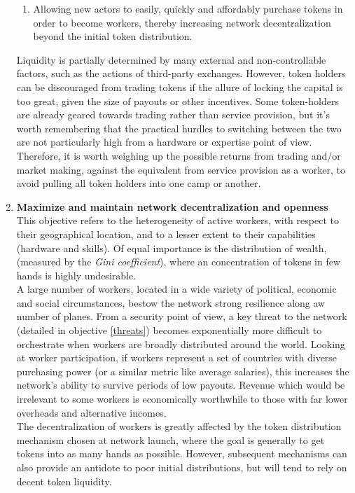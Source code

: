\documentclass[11pt]{amsart}
\begin{document}
\begin{enumerate}
\begin{enumerate}
   \item Allowing new actors to easily, quickly and affordably purchase tokens in order to become workers, thereby increasing network decentralization beyond the initial token distribution. 
   \end{enumerate}
   Liquidity is partially determined by many external and non-controllable factors, such as the actions of third-party exchanges. However, token holders can be discouraged from trading tokens if the allure of locking the capital is too great, given the size of payouts or other incentives. Some token-holders are already geared towards trading rather than service provision, but it's worth remembering that the practical hurdles to switching between the two are not particularly high from a hardware or expertise point of view. Therefore, it is worth weighing up the possible returns from trading and/or market making, against the equivalent from service provision as a worker, to avoid pulling all token holders into one camp or another. 
   \\
   \item \textbf{Maximize and maintain network decentralization and openness}\label{decent}
   \\
   This objective refers to the heterogeneity of active workers, with respect to their geographical location, and to a lesser extent to their capabilities (hardware and skills). Of equal importance is the distribution of wealth, (measured by the \textit{Gini coefficient}), where an concentration of tokens in few hands is highly undesirable.
   \\
   A large number of workers, located in a wide variety of political, economic and social circumstances, bestow the network strong resilience along aw number of planes. From a security point of view, a key threat to the network (detailed in objective \ref{threats}) becomes exponentially more difficult to orchestrate when workers are broadly distributed around the world. Looking at worker participation, if workers represent a set of countries with diverse purchasing power (or a similar metric like average salaries), this increases the network's ability to survive periods of low payouts. Revenue which would be irrelevant to some workers is economically worthwhile to those with far lower overheads and alternative incomes. 
   \\
   The decentralization of workers is greatly affected by the token distribution mechanism chosen at network launch, where the goal is generally to get tokens into as many hands as possible. However, subsequent mechanisms can also provide an antidote to poor initial distributions, but will tend to rely on decent token liquidity.  

\end{enumerate}
\end{document}
